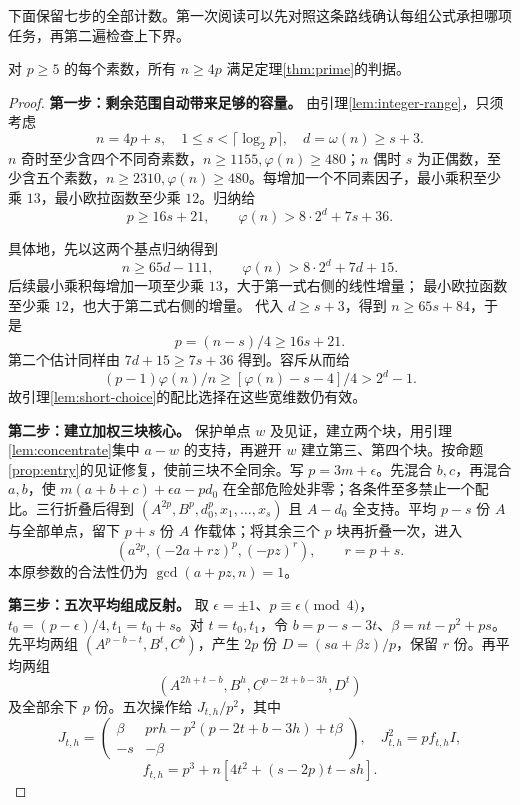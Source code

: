 下面保留七步的全部计数。第一次阅读可以先对照这条路线确认每组公式承担哪项任务，再第二遍检查上下界。
\begin{proposition}\label{prop:wide}
对 $p\ge5$ 的每个素数，所有 $n\ge4p$ 满足定理\ref{thm:prime}的判据。
\end{proposition}
\begin{proof}

\par\noindent\textbf{第一步：剩余范围自动带来足够的容量。}
由引理\ref{lem:integer-range}，只须考虑
\begin{equation}\label{eq:tail-range}
n=4p+s,\quad1\le s<\lceil\log_2p\rceil,\quad d=\omega(n)\ge s+3.
\end{equation}
$n$ 奇时至少含四个不同奇素数，$n\ge1155,\varphi(n)\ge480$；$n$ 偶时 $s$ 为正偶数，至少含五个素数，$n\ge2310,\varphi(n)\ge480$。每增加一个不同素因子，最小乘积至少乘 $13$，最小欧拉函数至少乘 $12$。归纳给
\begin{equation}\label{eq:tail-estimates}
p\ge16s+21,\qquad \varphi(n)>8\cdot2^d+7s+36.
\end{equation}

具体地，先以这两个基点归纳得到
\[
n\ge65d-111,\qquad \varphi(n)>8\cdot2^d+7d+15.
\]
后续最小乘积每增加一项至少乘 $13$，大于第一式右侧的线性增量；
最小欧拉函数至少乘 $12$，也大于第二式右侧的增量。
代入 $d\ge s+3$，得到 $n\ge65s+84$，于是
\[
p=(n-s)/4\ge16s+21.
\]
第二个估计同样由 $7d+15\ge7s+36$ 得到。容斥从而给
\[(p-1)\varphi(n)/n\ge[\varphi(n)-s-4]/4>2^d-1.
\]
故引理\ref{lem:short-choice}的配比选择在这些宽维数仍有效。


\par\noindent\textbf{第二步：建立加权三块核心。}
保护单点 $w$ 及见证，建立两个块，用引理\ref{lem:concentrate}集中 $a-w$ 的支持，再避开 $w$ 建立第三、第四个块。按命题\ref{prop:entry}的见证修复，使前三块不全同余。写 $p=3m+\epsilon$。先混合 $b,c$，再混合 $a,b$，使 $m(a+b+c)+\epsilon a-pd_0$ 在全部危险处非零；各条件至多禁止一个配比。三行折叠后得到 $(A^{2p},B^p,d_0^p,x_1,\ldots,x_s)$ 且 $A-d_0$ 全支持。平均 $p-s$ 份 $A$ 与全部单点，留下 $p+s$ 份 $A$ 作载体；将其余三个 $p$ 块再折叠一次，进入
\begin{equation}\label{eq:wide-core}
(a^{2p},(-2a+rz)^p,(-pz)^r),\qquad r=p+s.
\end{equation}
本原参数的合法性仍为 $\gcd(a+pz,n)=1$。


\par\noindent\textbf{第三步：五次平均组成反射。}
取 $\epsilon=\pm1$、$p\equiv\epsilon\pmod4$，$t_0=(p-\epsilon)/4,t_1=t_0+s$。对 $t=t_0,t_1$，令 $b=p-s-3t$、$\beta=nt-p^2+ps$。先平均两组 $(A^{p-b-t},B^t,C^b)$，产生 $2p$ 份 $D=(sa+\beta z)/p$，保留 $r$ 份。再平均两组
\[
(A^{2h+t-b},B^h,C^{p-2t+b-3h},D^t)
\]
及全部余下 $p$ 份。五次操作给 $J_{t,h}/p^2$，其中
\begin{equation}\label{eq:tail-J}
J_{t,h}=\begin{pmatrix}\beta&prh-p^2(p-2t+b-3h)+t\beta\\-s&-\beta\end{pmatrix},
\quad J_{t,h}^2=pf_{t,h}I,
\end{equation}
\[
f_{t,h}=p^3+n[4t^2+(s-2p)t-sh].
\]


\end{proof}
